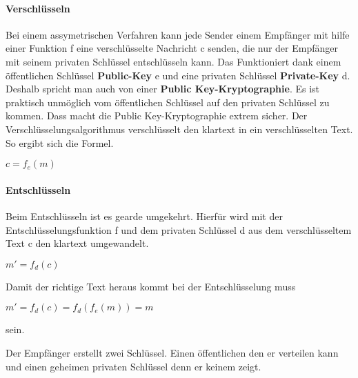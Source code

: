 \paragraph{Verschlüsseln}
Bei einem assymetrischen Verfahren kann jede Sender einem Empfänger mit hilfe einer Funktion f eine verschlüsselte Nachricht c senden, die nur der Empfänger mit seinem privaten Schlüssel entschlüsseln kann. Das Funktioniert dank einem öffentlichen Schlüssel \textbf{Public-Key} e und eine privaten Schlüssel \textbf{Private-Key} d. \\
Deshalb spricht man auch von einer  \textbf{Public Key-Kryptographie}. Es ist praktisch unmöglich vom öffentlichen Schlüssel auf den privaten Schlüssel zu kommen. Dass macht die Public Key-Kryptographie extrem sicher. 
Der Verschlüsselungsalgorithmus verschlüsselt den klartext in ein verschlüsselten Text. So ergibt sich die Formel.
\begin{center}
$ c = f_e (m) $
\end{center}
\paragraph{Entschlüsseln}
Beim Entschlüsseln ist es gearde umgekehrt. Hierfür wird mit der Entschlüsselungsfunktion f und dem privaten Schlüssel d aus dem verschlüsseltem Text c den klartext umgewandelt.
\begin{center}
$ m' = f_d (c) $
\end{center}
Damit der richtige Text heraus kommt bei der Entschlüsselung muss 
\begin{center}
$ m' = f_d (c) = f_d(f_e(m))  = m$
\end{center}
sein.


Der Empfänger erstellt zwei Schlüssel. Einen öffentlichen den er verteilen kann und einen geheimen privaten Schlüssel denn er keinem zeigt. 


